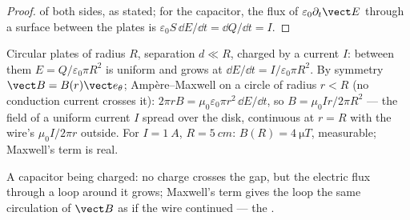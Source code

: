 \begin{proof}
 of both sides, as stated; for the capacitor, the flux of
$\varepsilon_0\partial_t\vect E$ through a surface between the plates is
$\varepsilon_0S\,\dd E/\dd t = \dd Q/\dd t = I$.
\end{proof}

\begin{example}\label{ex:b2:maxwell-equations:capacitor}
Circular plates of radius $R$, separation $d \ll R$, charged by a current
$I$: between them $E = Q/\varepsilon_0\pi R^2$ is uniform and grows at $\dd E/
\dd t = I/\varepsilon_0\pi R^2$. By symmetry $\vect B = B(r)\vect e_\theta$; Ampère--Maxwell
on a circle of radius $r < R$ (no conduction current crosses it): $2\pi rB
= \mu_0\varepsilon_0\pi r^2\,\dd E/\dd t$, so $B = \mu_0Ir/2\pi R^2$ --- the field of a
uniform current $I$ spread over the disk, continuous at $r = R$ with the
wire's $\mu_0I/2\pi r$ outside. For $I = \qty{1}{A}$, $R = \qty{5}{cm}$: $B(R) =
\qty{4}{\micro T}$, measurable; Maxwell's term is real.
\end{example}

\begin{omfigure}

{\small A capacitor being charged: no charge crosses the gap, but the
electric flux through a loop around it grows; Maxwell's term gives the
loop the same circulation of $\vect B$ as if the wire continued --- the
.}
\end{omfigure}

